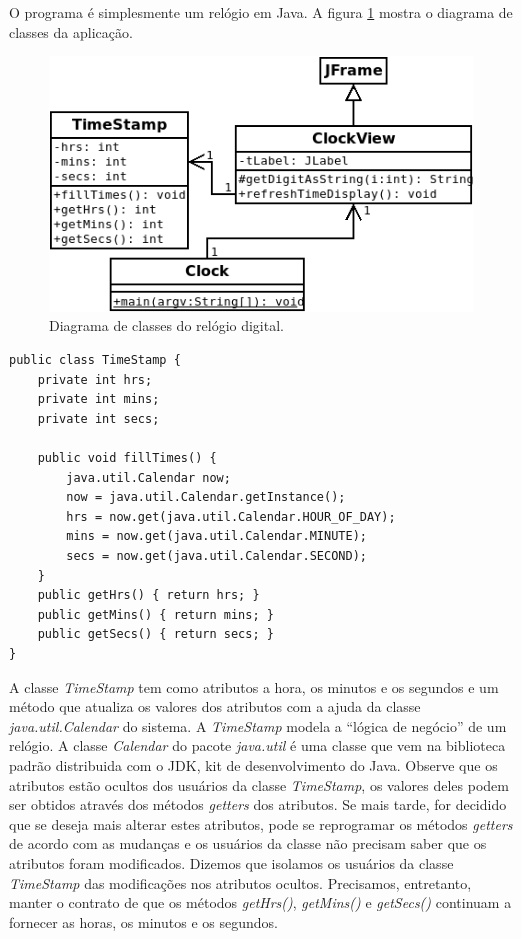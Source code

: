 \documentclass[
	article,			%
	12pt,				%
	openright,
	twoside,			%
	a4paper,			%
	english,			%
	french,
	brazil,				%
	sumario=tradicional
	]{abntex2}
\begin{document}
O programa é simplesmente um relógio em Java. A figura \ref{fig:clock} mostra o diagrama de classes da aplicação.

\begin{figure}[h]
\begin{center}
\includegraphics[scale=0.6]{clock.png} 
\caption{Diagrama de classes do relógio digital.} \label{fig:clock}
\end{center}
\end{figure}

\begin{verbatim}
public class TimeStamp {
    private int hrs;
    private int mins;
    private int secs;
    
    public void fillTimes() {
        java.util.Calendar now;
        now = java.util.Calendar.getInstance();
        hrs = now.get(java.util.Calendar.HOUR_OF_DAY);
        mins = now.get(java.util.Calendar.MINUTE);
        secs = now.get(java.util.Calendar.SECOND);
    }
    public getHrs() { return hrs; }
    public getMins() { return mins; }
    public getSecs() { return secs; }
}
\end{verbatim}

A classe \emph{TimeStamp} tem como atributos a hora, os minutos e os segundos e um método que atualiza os valores dos atributos com a ajuda da classe \emph{java.util.Calendar} do sistema. A \emph{TimeStamp} modela a ``lógica de negócio'' de um relógio. A classe \emph{Calendar} do pacote \emph{java.util} é uma classe que vem na biblioteca padrão distribuida com o JDK, kit de desenvolvimento do Java. Observe que os atributos estão ocultos dos usuários da classe \emph{TimeStamp}, os valores deles podem ser obtidos através dos métodos \textit{getters} dos atributos. Se mais tarde, for decidido que se deseja mais alterar estes atributos, pode se reprogramar os métodos \textit{getters} de acordo com as mudanças e os usuários da classe não precisam saber que os atributos foram modificados. Dizemos que isolamos os usuários da classe \emph{TimeStamp} das modificações nos atributos ocultos. Precisamos, entretanto, manter o contrato de que os métodos \emph{getHrs()}, \emph{getMins()} e \emph{getSecs()} continuam a fornecer as horas, os minutos e os segundos.
\end{document}
